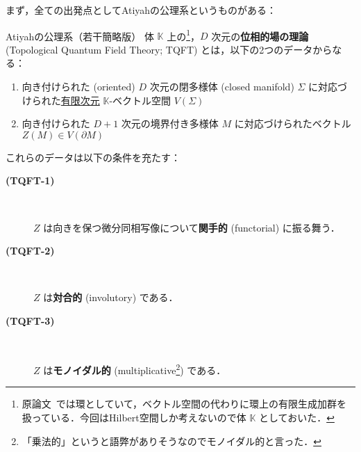 \documentclass[TQFT_main]{subfiles}
\begin{document}
まず，全ての出発点としてAtiyahの公理系\cite{Atiyah1988tqft}というものがある：

\begin{myaxiom}[label=ax:Atiyah-TQFT,breakable]{Atiyahの公理系（若干簡略版）}
    体 $\mathbb{K}$ 上の\footnote{原論文~\cite{Atiyah1988tqft}では環としていて，ベクトル空間の代わりに環上の有限生成加群を扱っている．今回はHilbert空間しか考えないので体 $\mathbb{K}$ としておいた．}，$D$ 次元の\textbf{位相的場の理論} (Topological Quantum Field Theory; TQFT) とは，以下の2つのデータからなる：
    \begin{enumerate}
        \item 向き付けられた (oriented) $D$ 次元の閉多様体 (closed manifold) $\Sigma$ に対応づけられた\underline{有限次元} $\mathbb{K}$-ベクトル空間 $V(\Sigma)$ 
        \item 向き付けられた $D+1$ 次元の境界付き多様体 $M$ に対応づけられたベクトル $Z(M) \in V(\partial M)$ 
    \end{enumerate}
    これらのデータは以下の条件を充たす：
    \begin{description}
        \item[\textbf{(TQFT-1)}]　
        
        $Z$ は向きを保つ微分同相写像について\textbf{関手的} (functorial) に振る舞う．
        
        
        \item[\textbf{(TQFT-2)}]　
        
        $Z$ は\textbf{対合的} (involutory) である．
        

        \item[\textbf{(TQFT-3)}]　
        
        $Z$ は\textbf{モノイダル的} (multiplicative\footnote{「乗法的」というと語弊がありそうなのでモノイダル的と言った．}) である．


\end{description}
\end{myaxiom}
\end{document}
